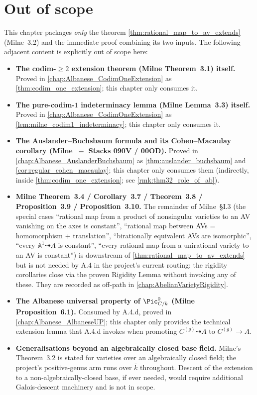 \section{Out of scope}
\label{sec:thm32_out_of_scope}

This chapter packages \emph{only} the theorem
\cref{thm:rational_map_to_av_extends} (Milne~3.2) and the immediate proof combining its
two inputs. The following adjacent content is explicitly out of scope here:
\begin{itemize}
  \item \textbf{The codim-\(\geq 2\) extension theorem (Milne Theorem~3.1) itself.}
    Proved in \cref{chap:Albanese_CodimOneExtension} as
    \cref{thm:codim_one_extension}; this chapter only consumes it.
  \item \textbf{The pure-codim-\(1\) indeterminacy lemma (Milne Lemma~3.3) itself.}
    Proved in \cref{chap:Albanese_CodimOneExtension} as
    \cref{lem:milne_codim1_indeterminacy}; this chapter only consumes it.
  \item \textbf{The Auslander--Buchsbaum formula and its Cohen--Macaulay corollary
    (Milne~\(\equiv\) Stacks 090V / 00OD).} Proved in
    \cref{chap:Albanese_AuslanderBuchsbaum} as \cref{thm:auslander_buchsbaum} and
    \cref{cor:regular_cohen_macaulay}; this chapter only consumes them (indirectly,
    inside \cref{thm:codim_one_extension}; see \cref{rmk:thm32_role_of_ab}).
  \item \textbf{Milne Theorem~3.4 / Corollary~3.7 / Theorem~3.8 / Proposition~3.9 /
    Proposition~3.10.} The remainder of Milne~\S I.3 (the special cases ``rational map
    from a product of nonsingular varieties to an AV vanishing on the axes is constant'',
    ``rational map between AVs = homomorphism + translation'', ``birationally equivalent
    AVs are isomorphic'', ``every \(\mathbb A^1 \dashrightarrow A\) is constant'',
    ``every rational map from a unirational variety to an AV is constant'') is downstream
    of \cref{thm:rational_map_to_av_extends} but is not needed by A.4 in the project's
    current routing: the rigidity corollaries close via the proven Rigidity Lemma without
    invoking any of these. They are recorded as off-path in
    \cref{chap:AbelianVarietyRigidity}.
  \item \textbf{The Albanese universal property of \(\Pic^0_{C/k}\) (Milne Proposition~6.1).}
    Consumed by A.4.d, proved in \cref{chap:Albanese_AlbaneseUP}; this chapter only
    provides the technical extension lemma that A.4.d invokes when promoting
    \(C^{(g)} \dashrightarrow A\) to \(C^{(g)} \to A\).
  \item \textbf{Generalisations beyond an algebraically closed base field.} Milne's
    Theorem~3.2 is stated for varieties over an algebraically closed field; the
    project's positive-genus arm runs over \(\bar k\) throughout.
    Descent of the extension to a non-algebraically-closed base, if ever needed, would
    require additional Galois-descent machinery and is not in scope.
\end{itemize}
